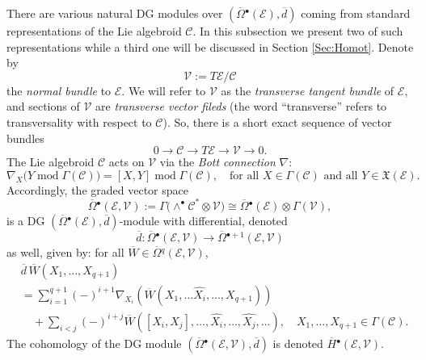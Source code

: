 \documentclass{conm-p-l}
\theoremstyle{definition}
\theoremstyle{remark}
\numberwithin{equation}{section}
\begin{document}
There are various natural DG modules over $(\overline \Omega{}^\bullet (\mathscr E), \overline d)$ coming from standard representations of the Lie algebroid $\mathscr C$. In this subsection we present two of such representations while a third one will be discussed in Section \ref{Sec:Homot}. Denote by
\[
\mathscr V := T\mathscr E / \mathscr C
\]
the \emph{normal bundle} to $\mathscr E$. We will refer to $\mathscr V$ as the \emph{transverse tangent bundle} of $\mathscr E$, and sections of $\mathscr V$ are \emph{transverse vector fileds} (the word ``transverse'' refers to transversality with respect to $\mathscr C$). So, there is a short exact sequence of vector bundles
\begin{equation}\label{eq:SES_C}
0 \longrightarrow \mathscr C \longrightarrow T\mathscr E \longrightarrow \mathscr V \longrightarrow 0.
\end{equation}
The Lie algebroid $\mathscr C$ acts on $\mathscr V$ via the \emph{Bott connection} $\nabla$:
\[
\nabla_X \big(Y \operatorname{mod} \Gamma (\mathscr C) \big) = [X, Y] \operatorname{mod} \Gamma (\mathscr C), \quad \text{for all $X \in \Gamma (\mathscr C)$ and all $Y \in \mathfrak X (\mathscr E)$}.
\]
Accordingly, the graded vector space
\[
\overline \Omega{}^{\bullet} (\mathscr E, \mathscr V) := \Gamma \big(\wedge^\bullet \mathscr C^\ast \otimes \mathscr V\big) \cong \overline \Omega{}^{\bullet} (\mathscr E) \otimes \Gamma (\mathscr V),
\]
is a DG $(\overline \Omega{}^{\bullet} (\mathscr E), \overline d)$-module with differential, denoted 
\[
\overline d : \overline \Omega{}^{\bullet} (\mathscr E, \mathscr V) \to \overline \Omega{}^{\bullet +1 } (\mathscr E, \mathscr V)
\]
as well, given by: for all $\overline W \in \overline \Omega{}^{q} (\mathscr E, \mathscr V)$,
\[
\begin{aligned}
& \overline d\, \overline W (X_1, \ldots, X_{q+1}) \\
& = \sum_{i = 1}^{q+1} (-)^{i+1}\nabla_{X_i} \left( \overline W (X_1, \ldots \widehat{X_i}, \ldots, X_{q+1})\right) \\
& \quad + \sum_{i < j} (-)^{i+j}\overline W  \left( [X_i, X_j], \ldots, \widehat{X_i}, \ldots, \widehat{X_j}, \ldots \right), \quad X_1, \ldots, X_{q+1} \in \Gamma (\mathscr C).
\end{aligned}
\]
The cohomology of the DG module $(\overline \Omega{}^{\bullet} (\mathscr E, \mathscr V), \overline d)$ is denoted $\overline H{}^\bullet (\mathscr E, \mathscr V)$.
\end{document}
